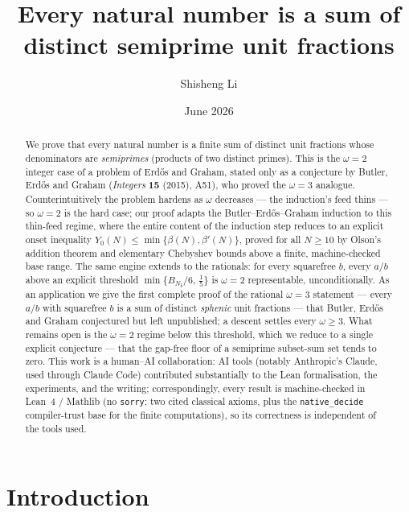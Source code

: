 \documentclass[11pt]{amsart}
\theoremstyle{plain}
\theoremstyle{definition}
\begin{document}
\title[Semiprime and sphenic Egyptian fractions]
{Every natural number is a sum of distinct semiprime unit fractions}

\author{Shisheng Li}
\date{June 2026}

\begin{abstract}
We prove that every natural number is a finite sum of distinct unit fractions
whose denominators are \emph{semiprimes} (products of two distinct primes).  This
is the $\omega=2$ integer case of a problem of Erd\H{o}s and Graham, stated only as a
conjecture by Butler, Erd\H{o}s and Graham (\emph{Integers} \textbf{15} (2015),
A51), who proved the $\omega=3$ analogue.  Counterintuitively the problem hardens
as $\omega$ decreases --- the induction's feed thins --- so $\omega=2$ is the hard
case; our proof adapts the Butler--Erd\H{o}s--Graham induction to this thin-feed
regime, where the entire content of the induction step reduces to an explicit
onset inequality $Y_0(N)\le\min\{\beta(N),\beta'(N)\}$, proved for all $N\ge10$ by
Olson's addition theorem and elementary Chebyshev bounds above a finite,
machine-checked base range.  The same engine extends to the rationals:
for every squarefree $b$, every $a/b$ above an explicit threshold
$\min\{B_{N_b}/6,\,\tfrac15\}$ is $\omega=2$ representable, unconditionally.  As an
application we give the first complete proof of the rational $\omega=3$ statement
--- every $a/b$ with squarefree $b$ is a sum of distinct \emph{sphenic} unit
fractions --- that Butler, Erd\H{o}s and Graham conjectured but left unpublished; a
descent settles every $\omega\ge3$.  What remains open is the $\omega=2$ regime below this
threshold, which we reduce to a single explicit conjecture --- that the gap-free
floor of a semiprime subset-sum set tends to zero.
This work is a human--AI collaboration: AI tools (notably Anthropic's Claude,
used through Claude Code) contributed substantially to the Lean formalisation, the
experiments, and the writing; correspondingly, every result is machine-checked in
Lean~4 / Mathlib (no \texttt{sorry}; two cited classical axioms, plus the
\texttt{native\_decide} compiler-trust base for the finite computations), so its
correctness is independent of the tools used.
\end{abstract}

\maketitle

\section{Introduction}
\end{document}
